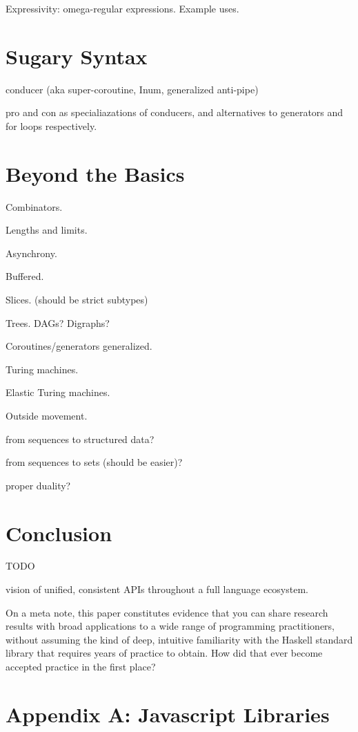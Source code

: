 \documentclass[sigplan,screen,10pt,anonymous,review]{acmart}
\begin{document}
Expressivity: omega-regular expressions. Example uses.

\section{Sugary Syntax}\label{syntax}

conducer (aka super-coroutine, Inum, generalized anti-pipe)

pro and con as specialiazations of conducers, and alternatives to generators and for loops respectively.

\section{Beyond the Basics}\label{fun}

Combinators.

Lengths and limits.

Asynchrony.

Buffered.

Slices. (should be strict subtypes)

Trees. DAGs? Digraphs?

Coroutines/generators generalized.

Turing machines.

Elastic Turing machines.

Outside movement.

from sequences to structured data?

from sequences to sets (should be easier)?

proper duality?

\section{Conclusion}\label{conclusion}

TODO

vision of unified, consistent APIs throughout a full language ecosystem.

On a meta note, this paper constitutes evidence that you can share research results with broad applications to a wide range of programming practitioners, without assuming the kind of deep, intuitive familiarity with the Haskell standard library that requires years of practice to obtain. How did that ever become accepted practice in the first place?

\section{Appendix A: Javascript Libraries}\label{wtfjs}
\end{document}
